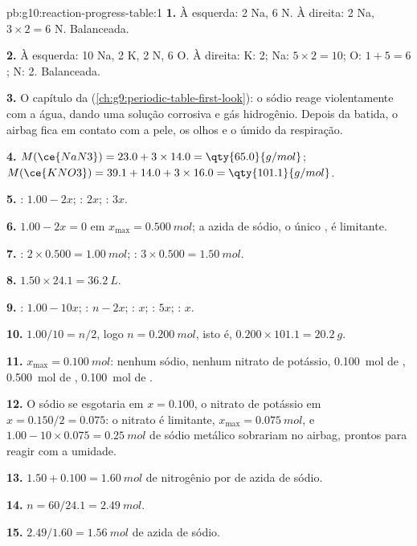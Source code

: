 \begin{solution}{pb:g10:reaction-progress-table:1}
\textbf{1.} À esquerda: 2 Na, 6 N. À direita: 2 Na, $3 \times 2 = 6$ N.
Balanceada.

\textbf{2.} À esquerda: 10 Na, 2 K, 2 N, 6 O. À direita: K: 2; Na: $5 \times 2 =
10$; O: $1 + 5 = 6$; N: 2. Balanceada.

\textbf{3.} O capítulo da  (\cref{ch:g9:periodic-table-first-look}):
o sódio reage violentamente com a água, dando uma solução corrosiva e
gás hidrogênio. Depois da batida, o airbag fica em contato com a pele,
os olhos e o  úmido da respiração.

\textbf{4.} $M(\ce{NaN3}) = 23.0 + 3 \times 14.0 = \qty{65.0}{g/mol}$;
$M(\ce{KNO3}) = 39.1 + 14.0 + 3 \times 16.0 = \qty{101.1}{g/mol}$.

\textbf{5.} : $1.00 - 2x$; : $2x$; : $3x$.

\textbf{6.} $1.00 - 2x = 0$ em $x_{\max} = \qty{0.500}{mol}$; a azida de
sódio, o único , é limitante.

\textbf{7.} : $2 \times 0.500 = \qty{1.00}{mol}$; :
$3 \times 0.500 = \qty{1.50}{mol}$.

\textbf{8.} $1.50 \times 24.1 = \qty{36.2}{L}$.

\textbf{9.} : $1.00 - 10x$; : $n - 2x$; : $x$;
: $5x$; : $x$.

\textbf{10.} $1.00/10 = n/2$, logo $n = \qty{0.200}{mol}$, isto é,
$0.200 \times 101.1 = \qty{20.2}{g}$.

\textbf{11.} $x_{\max} = \qty{0.100}{mol}$: nenhum sódio, nenhum nitrato
de potássio, \qty{0.100}{mol} de , \qty{0.500}{mol} de
, \qty{0.100}{mol} de .

\textbf{12.} O sódio se esgotaria em $x = 0.100$, o nitrato de potássio
em $x = 0.150/2 = 0.075$: o nitrato é limitante, $x_{\max} =
\qty{0.075}{mol}$, e $1.00 - 10 \times 0.075 = \qty{0.25}{mol}$ de sódio
metálico sobrariam no airbag, prontos para reagir com a umidade.

\textbf{13.} $1.50 + 0.100 = \qty{1.60}{mol}$ de nitrogênio por  de
azida de sódio.

\textbf{14.} $n = 60 / 24.1 = \qty{2.49}{mol}$.

\textbf{15.} $2.49 / 1.60 = \qty{1.56}{mol}$ de azida de sódio.


\end{solution}
